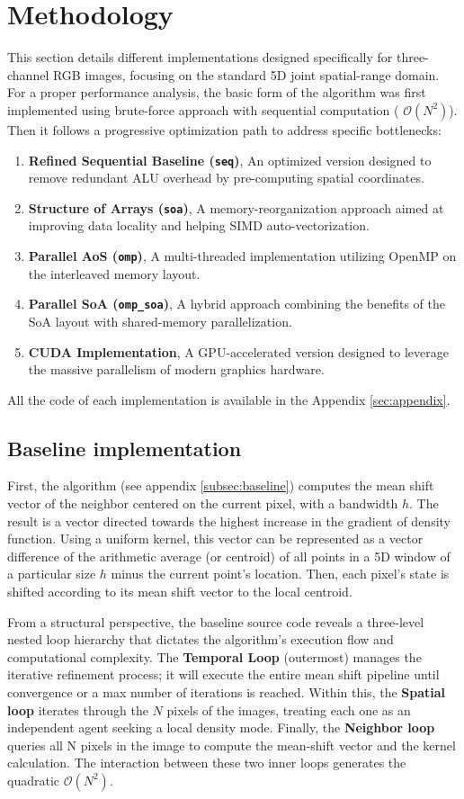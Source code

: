 \documentclass[10pt,twocolumn,letterpaper]{article}
\begin{document}
\section{Methodology}\label{sec:method}
This section details different implementations designed specifically for three-channel RGB images, focusing on the standard 5D joint spatial-range domain. For a proper performance analysis, the basic form of the algorithm was first implemented using brute-force approach with sequential computation ( $\mathcal O(N^2)$). Then it follows a progressive optimization path to address specific bottlenecks:
\begin{enumerate}
\item \textbf{Refined Sequential Baseline (\texttt{seq})}, An optimized version designed to remove redundant ALU overhead by pre-computing spatial coordinates.
\item \textbf{Structure of Arrays (\texttt{soa})}, A memory-reorganization approach aimed at improving data locality and helping SIMD auto-vectorization.
\item \textbf{Parallel AoS (\texttt{omp})}, A multi-threaded implementation utilizing OpenMP on the interleaved memory layout.
\item \textbf{Parallel SoA (\texttt{omp\_soa})}, A hybrid approach combining the benefits of the SoA layout with shared-memory parallelization.
\item \textbf{CUDA Implementation}, A GPU-accelerated version designed to leverage the massive parallelism of modern graphics hardware.
\end{enumerate}
All the code of each implementation is available in the Appendix \ref{sec:appendix}.


\subsection{Baseline implementation}
First, the algorithm (see appendix \ref{subsec:baseline}) computes the mean shift vector of the neighbor centered on the current pixel, with a bandwidth $h$. The result is a vector directed towards the highest increase in the gradient of density function. Using a uniform kernel, this vector can be represented as a vector difference of the arithmetic average (or centroid) of all points in a 5D window  of a particular size $h$ minus the current point's location.  Then, each pixel's state is shifted according to its mean shift vector to the local centroid. 

From a structural perspective, the baseline source code reveals a three-level nested loop hierarchy that dictates the algorithm's execution flow and computational complexity. The \textbf{Temporal Loop} (outermost) manages the iterative refinement process; it will execute the entire mean shift pipeline until convergence or a max number of iterations is reached. Within this, the \textbf{Spatial loop} iterates through the $N$ pixels of the images, treating each one as an independent agent seeking a local density mode. Finally, the \textbf{Neighbor loop} queries all N pixels in the image to compute the mean-shift vector and the kernel calculation. The interaction between these two inner loops generates the quadratic $\mathcal O(N^2)$.
\end{document}
